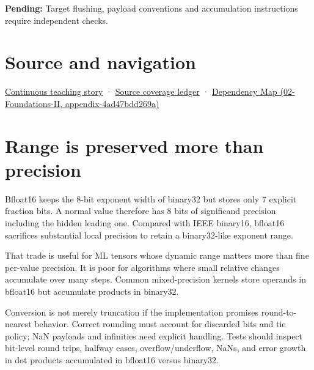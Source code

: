 \textbf{Pending:} Target flushing, payload conventions and accumulation instructions require independent checks.

\section{Source and navigation}\label{appendix-18b8dd966b5d-source-and-navigation}

\href{Continuous\%20Notes/Computing\%20Foundations\%20-\%20From\%20Bits\%20to\%20C++\%20and\%20Systems\%20APIs\#Choosing\%20what\%20information\%20to\%20keep}{Continuous teaching story} · \hyperref[appendix-fd090d982a15]{Source coverage ledger} · \href{../02-Foundations-II/main.pdf\#nameddest=appendix-4ad47bdd269a}{Dependency Map (02-Foundations-II, appendix-4ad47bdd269a)}

\section{Range is preserved more than precision}\label{appendix-18b8dd966b5d-range-is-preserved-more-than-precision}

Bfloat16 keeps the 8-bit exponent width of binary32 but stores only 7 explicit fraction bits. A normal value therefore has 8 bits of significand precision including the hidden leading one. Compared with IEEE binary16, bfloat16 sacrifices substantial local precision to retain a binary32-like exponent range.

That trade is useful for ML tensors whose dynamic range matters more than fine per-value precision. It is poor for algorithms where small relative changes accumulate over many steps. Common mixed-precision kernels store operands in bfloat16 but accumulate products in binary32.

Conversion is not merely truncation if the implementation promises round-to-nearest behavior. Correct rounding must account for discarded bits and tie policy; NaN payloads and infinities need explicit handling. Tests should inspect bit-level round trips, halfway cases, overflow/underflow, NaNs, and error growth in dot products accumulated in bfloat16 versus binary32.
